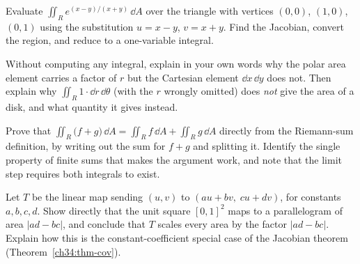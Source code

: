 \begin{exercise}
\label{ch34:exr-cov}
Evaluate $\displaystyle\iint_R e^{(x-y)/(x+y)}\,\dd A$ over the triangle with
vertices $(0,0)$, $(1,0)$, $(0,1)$ using the substitution $u=x-y$, $v=x+y$.
Find the Jacobian, convert the region, and reduce to a one-variable integral.
\end{exercise}

\begin{exercise}
\label{ch34:exr-polar-concept}
Without computing any integral, explain in your own words why the polar area
element carries a factor of $r$ but the Cartesian element $\dd x\,\dd y$ does not.
Then explain why $\iint_R 1\cdot\dd r\,\dd\theta$ (with the $r$ wrongly omitted)
does \emph{not} give the area of a disk, and what quantity it gives instead.
\end{exercise}

\begin{exercise}
\label{ch34:exr-linearity}
Prove that $\iint_R\big(f+g\big)\,\dd A=\iint_R f\,\dd A+\iint_R g\,\dd A$
directly from the Riemann-sum definition, by writing out the sum for $f+g$ and
splitting it. Identify the single property of finite sums that makes the
argument work, and note that the limit step requires both integrals to exist.
\end{exercise}

\begin{exercise}
\label{ch34:exr-det-area}
Let $T$ be the linear map sending $(u,v)$ to $(au+bv,\;cu+dv)$, for constants
$a,b,c,d$. Show directly that
the unit square $[0,1]^2$ maps to a parallelogram of area $|ad-bc|$, and conclude
that $T$ scales every area by the factor $|ad-bc|$. Explain how this is the
constant-coefficient special case of the Jacobian theorem
(Theorem~\ref{ch34:thm-cov}).
\end{exercise}
